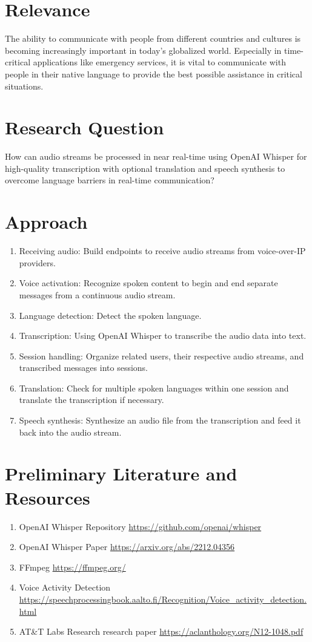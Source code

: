 \documentclass[a4paper,10pt]{article}
\begin{document}
\section{Relevance}
The ability to communicate with people from different countries and cultures is becoming increasingly important in today's globalized world.
Especially in time-critical applications like emergency services, it is vital to communicate with people in their native language to provide the best possible assistance in critical situations.


\section{Research Question}
How can audio streams be processed in near real-time using OpenAI Whisper for high-quality transcription with optional translation and speech synthesis to overcome language barriers in real-time communication?


\section{Approach}
\begin{enumerate}
  \item Receiving audio: Build endpoints to receive audio streams from voice-over-IP providers.
  \item Voice activation: Recognize spoken content to begin and end separate messages from a continuous audio stream.
  \item Language detection: Detect the spoken language.
  \item Transcription: Using OpenAI Whisper to transcribe the audio data into text.
  \item Session handling: Organize related users, their respective audio streams, and transcribed messages into sessions.
  \item Translation: Check for multiple spoken languages within one session and translate the transcription if necessary.
  \item Speech synthesis: Synthesize an audio file from the transcription and feed it back into the audio stream.
\end{enumerate}


\section{Preliminary Literature and Resources}
\begin{enumerate}
  \item OpenAI Whisper Repository \url{https://github.com/openai/whisper}
  \item OpenAI Whisper Paper \url{https://arxiv.org/abs/2212.04356}
  \item FFmpeg \url{https://ffmpeg.org/}
  \item Voice Activity Detection \url{https://speechprocessingbook.aalto.fi/Recognition/Voice_activity_detection.html}
  \item AT\&T Labs Research research paper \url{https://aclanthology.org/N12-1048.pdf}
\end{enumerate}
\end{document}
